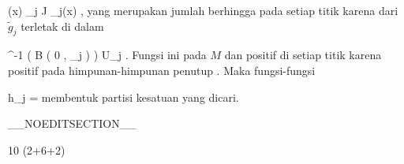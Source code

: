 {\mavergleichskettedisp
{\vergleichskette
{ (x)
}
{ } { \sum_{j \in J} _j(x)
}
{ } {
}
{ } {
}
{ } {
}
}
{}{}{,}
yang merupakan jumlah berhingga pada setiap titik karena
dari $\tilde{g}_j$ terletak di dalam

\mavergleichskettedisp
{\vergleichskette
{ \alpha^{-1} \left(  B  \left(  0 , \delta_j  \right)  \right)
}
{ \subset} { U_j
}
{ } {
}
{ } {
}
{ } {
}
}
{}{}{}
. Fungsi ini
pada $M$ dan positif di setiap titik karena
 positif pada himpunan-himpunan penutup
. Maka fungsi-fungsi

\mavergleichskettedisp
{\vergleichskette
{ h_j
}
{ =} { {  }
}
{ } {
}
{ } {
}
{ } {
}
}
{}{}{}
membentuk partisi kesatuan yang dicari.

 }

__NOEDITSECTION__

{10 (2+6+2)}

